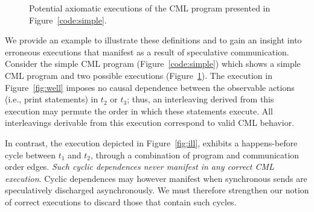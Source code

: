 \begin{figure}[t]
\begin{minipage}{0.45\textwidth}
\end{minipage}
\caption{Potential axiomatic executions of the CML program presented in Figure~\ref{code:simple}.}
\label{fig:pgm_and_execs}
\end{figure}

We provide an example to illustrate these definitions and to gain an insight
into erroneous executions that manifest as a result of speculative
communication. Consider the simple CML program (Figure~\ref{code:simple}) which
shows a simple CML program and two possible executions
(Figure~\ref{fig:pgm_and_execs}). The execution in Figure~\ref{fig:well}
imposes no causal dependence between the observable actions (i.e., print
statements) in $t_2$ or $t_3$; thus, an interleaving derived from this
execution may permute the order in which these statements execute. All
interleavings derivable from this execution correspond to valid CML behavior.

In contrast, the execution depicted in Figure~\ref{fig:ill}, exhibits a
happens-before cycle between $t_1$ and $t_2$, through a combination of program
and communication order edges. \emph{Such cyclic dependences never manifest in
any correct CML execution}. Cyclic dependences may however manifest when
synchronous sends are speculatively discharged asynchronously. We must
therefore strengthen our notion of correct executions to discard those that
contain such cycles.

